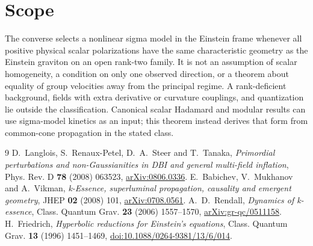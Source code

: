 \documentclass[11pt]{article}
\begin{document}
\section{Scope}
The converse selects a nonlinear sigma model in the Einstein frame whenever all positive physical scalar polarizations have the same characteristic geometry as the Einstein graviton on an open rank-two family. It is not an assumption of scalar homogeneity, a condition on only one observed direction, or a theorem about equality of group velocities away from the principal regime. A rank-deficient background, fields with extra derivative or curvature couplings, and quantization lie outside the classification. Canonical scalar Hadamard and modular results can use sigma-model kinetics as an input; this theorem instead derives that form from common-cone propagation in the stated class.

\begin{thebibliography}{9}
D.~Langlois, S.~Renaux-Petel, D.~A.~Steer and T.~Tanaka,
\emph{Primordial perturbations and non-Gaussianities in DBI and general multi-field inflation},
Phys. Rev. D \textbf{78} (2008) 063523, \href{https://arxiv.org/abs/0806.0336}{arXiv:0806.0336}.
E.~Babichev, V.~Mukhanov and A.~Vikman,
\emph{k-Essence, superluminal propagation, causality and emergent geometry},
JHEP \textbf{02} (2008) 101, \href{https://arxiv.org/abs/0708.0561}{arXiv:0708.0561}.
A.~D.~Rendall, \emph{Dynamics of k-essence},
Class. Quantum Grav. \textbf{23} (2006) 1557--1570,
\href{https://arxiv.org/abs/gr-qc/0511158}{arXiv:gr-qc/0511158}.
H.~Friedrich, \emph{Hyperbolic reductions for Einstein's equations},
Class. Quantum Grav. \textbf{13} (1996) 1451--1469,
\href{https://doi.org/10.1088/0264-9381/13/6/014}{doi:10.1088/0264-9381/13/6/014}.
\end{thebibliography}
\end{document}
